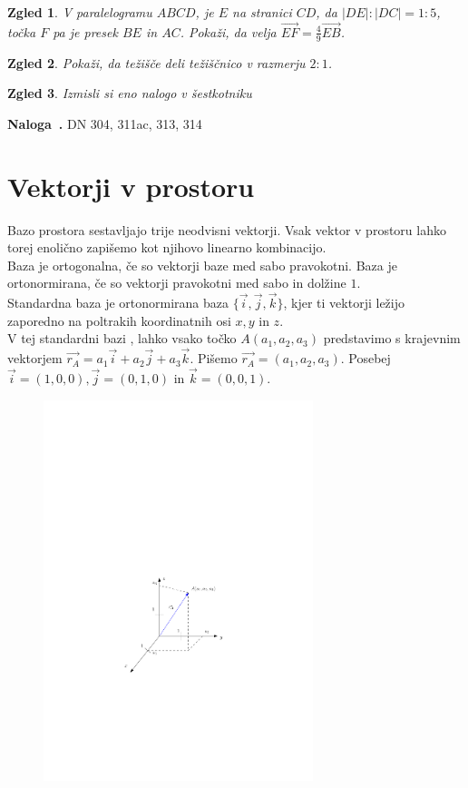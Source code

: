 \documentclass{article}
\newcounter{example}[section]
\newenvironment{example}[1][]{\refstepcounter{example}\par\medskip
   \noindent \textbf{Naloga~\theexample. #1} \rmfamily}{\medskip}
\newtheorem*{zgled}{Zgled}
\begin{document}
\begin{zgled}
    V paralelogramu $ABCD$, je $E$ na stranici $CD$, da $|DE|:|DC|=1:5$, točka $F$ pa je presek $BE$ in $AC$. Pokaži, da velja $\vec{EF}=\frac{4}{9}\vec{EB}$.
\end{zgled}

\begin{zgled}
    Pokaži, da težišče deli težiščnico v razmerju $2:1$.
\end{zgled}

\begin{zgled}
    Izmisli si eno nalogo v šestkotniku
\end{zgled}

\begin{example}
    DN 304, 311ac, 313, 314
\end{example}


\section{Vektorji v prostoru}

Bazo prostora sestavljajo trije neodvisni vektorji. Vsak vektor v prostoru lahko torej enolično zapišemo kot njihovo linearno kombinacijo.\\
Baza je ortogonalna, če so vektorji baze med sabo pravokotni. Baza je ortonormirana, če so vektorji pravokotni med sabo in dolžine $1$.\\
Standardna baza je ortonormirana baza $\{\vec{i},\vec{j},\vec{k}\}$, kjer ti vektorji ležijo zaporedno na poltrakih koordinatnih osi $x,y$ in $z$.\\
V tej standardni bazi , lahko vsako točko $A(a_1,a_2,a_3)$ predstavimo s krajevnim vektorjem $\vec{r_A}=a_1 \vec{i}+a_2\vec{j}+a_3\vec{k}$. Pišemo $\vec{r_A}=(a_1,a_2,a_3)$. Posebej $\vec{i}=(1,0,0) , \vec{j}=(0,1,0)$ in $\vec{k}=(0,0,1)$.

\begin{figure}[H]
\includegraphics[width=0.7\textwidth]{vektorji_slika.pdf}
\centering
\end{figure}
\end{document}
